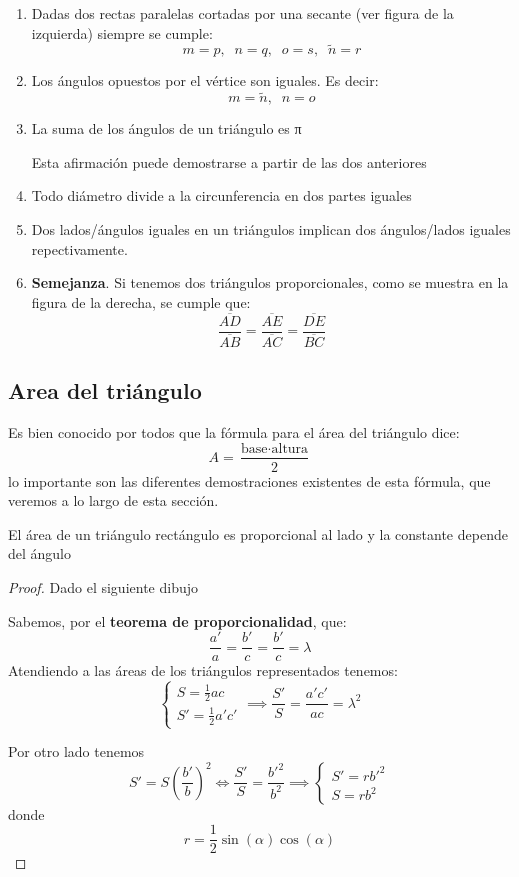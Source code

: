 \documentclass{apuntes}
\begin{document}
\begin{theorem}
\begin{enumerate}
\item Dadas dos rectas paralelas cortadas por una secante (ver figura de la izquierda) siempre se cumple:
\[m=p, \;\; n=q, \;\; o=s, \;\; \tilde{n}=r\]

\item Los ángulos opuestos por el vértice son iguales. Es decir:
\[m=\tilde{n}, \;\; n=o\]

\item La suma de los ángulos de un triángulo es π

\obs Esta afirmación puede demostrarse a partir de las dos anteriores

\item Todo diámetro divide a la circunferencia en dos partes iguales

\item Dos lados/ángulos iguales en un triángulos implican dos ángulos/lados iguales repectivamente.

\item \textbf{Semejanza}. Si tenemos dos triángulos proporcionales, como se muestra en la figura de la derecha, se cumple que:
\[\frac{\overline{AD}}{\overline{AB}} = \frac{\overline{AE}}{\overline{AC}} =\frac{\overline{DE}}{\overline{BC}}\]
\end{enumerate}
\end{theorem}


\subsection{Area del triángulo}
Es bien conocido por todos que la fórmula para el área del triángulo dice:
\[A= \frac{\text{base}\cdot\text{altura}}{2}\]
lo importante son las diferentes demostraciones existentes de esta fórmula, que veremos a lo largo de esta sección.

\begin{lemma}
El área de un triángulo rectángulo es proporcional al lado y la constante depende del ángulo
\end{lemma}
\begin{proof}
Dado el siguiente dibujo
\begin{center}
\end{center}
Sabemos, por el \textbf{teorema de proporcionalidad}, que:
\[\frac{a'}{a} = \frac{b'}{c} = \frac{b'}{c} = λ\]
Atendiendo a las áreas de los triángulos representados tenemos:
\[\left\{ \begin{array}{l} S= \frac{1}{2}ac \\ S' = \frac{1}{2} a'c'\end{array}\right. \implies \frac{S'}{S} =\frac{a'c'}{ac} = λ^2\]

Por otro lado tenemos
\[S' = S\left( \frac{b'}{b}\right)^2 \iff \frac{S'}{S} = \frac{b'^2}{b^2} \implies \left\{ \begin{array}{l} S' = rb'^2 \\ S= r b^2 \end{array}\right.\]
donde
\[r=\frac{1}{2} \sin(α)\cos(α)\]
\end{proof}
\end{document}
